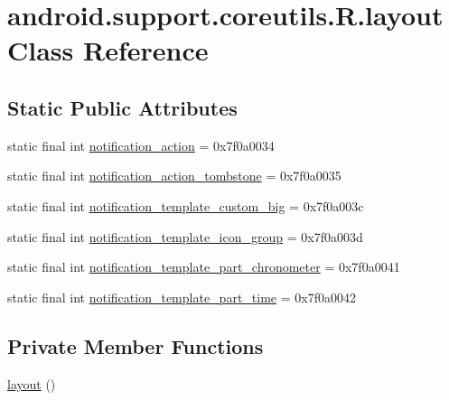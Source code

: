 \hypertarget{classandroid_1_1support_1_1coreutils_1_1_r_1_1layout}{}\section{android.\+support.\+coreutils.\+R.\+layout Class Reference}
\label{classandroid_1_1support_1_1coreutils_1_1_r_1_1layout}
\subsection*{Static Public Attributes}
\begin{DoxyCompactItemize}
\item 
static final int \mbox{\hyperlink{classandroid_1_1support_1_1coreutils_1_1_r_1_1layout_a5e1804f7a96ee0ab4e11a27875be0951}{notification\+\_\+action}} = 0x7f0a0034
\item 
static final int \mbox{\hyperlink{classandroid_1_1support_1_1coreutils_1_1_r_1_1layout_a6d1bc2179e1826704db862bcedbdb322}{notification\+\_\+action\+\_\+tombstone}} = 0x7f0a0035
\item 
static final int \mbox{\hyperlink{classandroid_1_1support_1_1coreutils_1_1_r_1_1layout_a1e82ecf13e5dff977c5ab5e5486ce4fc}{notification\+\_\+template\+\_\+custom\+\_\+big}} = 0x7f0a003c
\item 
static final int \mbox{\hyperlink{classandroid_1_1support_1_1coreutils_1_1_r_1_1layout_ac37f0494791c27289807b7312e952167}{notification\+\_\+template\+\_\+icon\+\_\+group}} = 0x7f0a003d
\item 
static final int \mbox{\hyperlink{classandroid_1_1support_1_1coreutils_1_1_r_1_1layout_a3290b638115231674c843239185ff25f}{notification\+\_\+template\+\_\+part\+\_\+chronometer}} = 0x7f0a0041
\item 
static final int \mbox{\hyperlink{classandroid_1_1support_1_1coreutils_1_1_r_1_1layout_ac91cfa7131f75c5f3bed1d28fce1b717}{notification\+\_\+template\+\_\+part\+\_\+time}} = 0x7f0a0042
\end{DoxyCompactItemize}
\subsection*{Private Member Functions}
\begin{DoxyCompactItemize}
\item 
\mbox{\hyperlink{classandroid_1_1support_1_1coreutils_1_1_r_1_1layout_a7a0f5a5cd2d21f29a22bf891bd461917}{layout}} ()
\end{DoxyCompactItemize}


